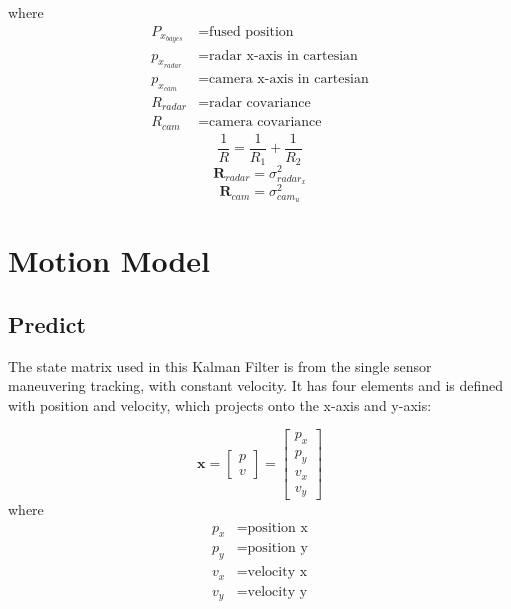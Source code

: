 where
\begin{align*}
    P_{x_{bayes}} &= \text{fused position}\\
    p_{x_{radar}} &= \text{radar x-axis in cartesian}\\
    p_{x_{cam}} &= \text{camera x-axis in cartesian}\\
    R_{radar} &= \text{radar covariance}\\
    R_{cam} &= \text{camera covariance}
\end{align*}
\begin{equation}\label{equ:bayes4}
    \frac{1}{R}=\frac{1}{R_1}+\frac{1}{R_2}
\end{equation}
\begin{equation}\label{equ:2-radar_R}
    \mathbf{R}_{radar} = 
        \sigma_{radar_x}^2 
\end{equation}
\begin{equation}\label{equ:2-R_cam}
    \mathbf{R}_{cam} = 
        \sigma_{cam_u}^2
\end{equation}


\section{Motion Model}\label{sec:2-kalman_filter}

\subsection{Predict}\label{sec:2-predict}
The state matrix used in this Kalman Filter \cite{kalman} is from the single sensor maneuvering tracking, with constant velocity.
It has four elements and is defined with position and velocity, which projects onto the x-axis and y-axis:

\begin{equation}\label{equ:state_eq}
    \mathbf{x} = 
        \begin{bmatrix} 
        p \\ 
        v 
        \end{bmatrix} = 
        \begin{bmatrix} 
        p_x \\ 
        p_y \\ 
        v_x \\ 
        v_y 
        \end{bmatrix}
\end{equation}
where
\begin{align*}
    p_x &=\text{position x}\\
    p_y &=\text{position y}\\
    v_x &=\text{velocity x}\\
    v_y &=\text{velocity y}\\
\end{align*}


